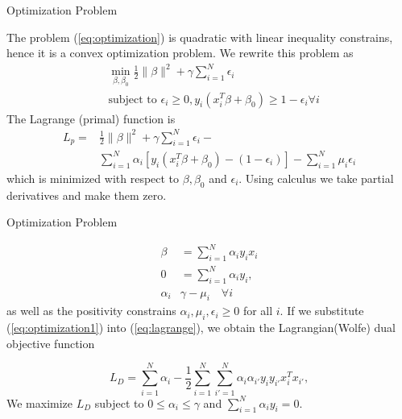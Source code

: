 \documentclass{beamer}
\begin{document}
\begin{frame}{Optimization Problem}
	
	The problem (\ref{eq:optimization}) is quadratic with linear inequality constrains, hence it is a convex optimization problem. We rewrite this problem as
	\begin{equation*}
		\begin{split}
	&\min_{\beta,\beta_0} \frac{1}{2}\| \beta \|^2 + \gamma \sum_{i=1}^N \epsilon_i  \\
	& \textrm{subject to } \epsilon_i \ge 0, y_i ( x_i^T \beta + \beta_0) \ge 1 -\epsilon_i \forall i
		\end{split}
	\end{equation*}
	The Lagrange (primal) function is 
	\begin{equation}
		\begin{split}
L_p=& \frac{1}{2} \|\beta\|^2 + \gamma \sum_{i=1}^N \epsilon_i -  \\
&\sum_{i=1}^{N} \alpha_i [ y_i (x_i^T \beta + \beta_0)-(1-\epsilon_i)] - \sum_{i=1}^{N} \mu_i \epsilon_i
		\end{split}
	\label{eq:lagrange}
	\end{equation}
which is minimized with respect to $\beta, \beta_0$ and $\epsilon_i$. Using calculus we take partial derivatives and make them zero.
\end{frame}

\begin{frame}{Optimization Problem}
	
	\begin{equation}
		\begin{split}
			\beta&= \sum_{i=1}^N \alpha_i y_i x_i \\
			0 &= \sum_{i=1}^N \alpha_i y_i,\\
			\alpha_i & \gamma - \mu_i \quad \forall i
		\end{split}
	\label{eq:optimization1}
	\end{equation}
as well as the positivity constrains $\alpha_i,\mu_i,\epsilon_i \ge 0$ for all $i$. If we substitute (\ref{eq:optimization1}) into (\ref{eq:lagrange}), we obtain the Lagrangian(Wolfe) dual objective function 

\begin{equation}
	L_D= \sum_{i=1}^N \alpha_i - \frac{1}{2} \sum_{i=1}^N \sum_{i'=1}^N \alpha_i \alpha_{i'} y_i y_{i'} x_i^T x_{i'},
\label{eq:lagrange2}
\end{equation}
We maximize $L_D$ subject to $0 \le \alpha_i \le \gamma$ and $\sum_{i=1}^N \alpha_i y_i=0$.
\end{frame}
\end{document}
